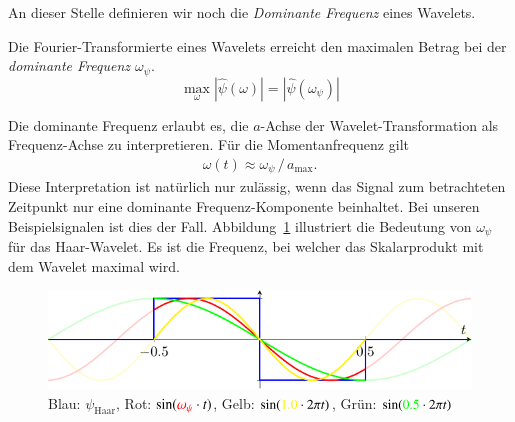 An dieser Stelle definieren wir noch die \emph{Dominante Frequenz} eines Wavelets.
\begin{definition}
	Die Fourier-Transformierte eines Wavelets erreicht den maximalen Betrag bei der \emph{dominante Frequenz $\omega_\psi$}.
	\begin{equation}
		\max_{\omega}\left|\hat\psi(\omega)\right| = \left|\hat\psi(\omega_\psi)\right|
	\end{equation}
	
\end{definition}

Die dominante Frequenz erlaubt es, die $a$-Achse der Wavelet-Transformation als Frequenz-Achse zu interpretieren.
Für die Momentanfrequenz gilt
\begin{align}
	\omega(t) \approx \omega_\psi\,/\,a_\text{max}.
\end{align}
Diese Interpretation ist natürlich nur zulässig, wenn das Signal zum betrachteten Zeitpunkt nur eine dominante Frequenz-Komponente beinhaltet.
Bei unseren Beispielsignalen ist dies der Fall.
Abbildung~\ref{complex:dom-freq} illustriert die Bedeutung von $\omega_\psi$ für das Haar-Wavelet.
Es ist die Frequenz, bei welcher das Skalarprodukt mit dem Wavelet maximal wird.
\begin{figure}
	\centering
	\includegraphics{papers/complex/images/haar_dom.pdf}
	
	\caption{Blau: $\psi_\text{Haar}$, Rot: $\sin ({\color{red}\omega_\psi}\cdot t)$, Gelb: $\sin ({\color{yellow}1.0}\cdot 2\pi t)$, Grün: $\sin ({\color{green}0.5}\cdot 2\pi t)$}
	\label{complex:dom-freq}
\end{figure}

